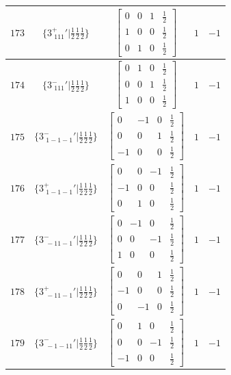 \documentclass[fleqn,8pt]{jsarticle}
\begin{document}
\begin{longtable}{ccccc}
$ 173 $ & $ \{3^{+}_{\,\,111}{}'|\frac{1}{2} \frac{1}{2} \frac{1}{2}\} $ & $ \begin{bmatrix} 0 & 0 & 1 & \frac{1}{2} \\ 1 & 0 & 0 & \frac{1}{2} \\ 0 & 1 & 0 & \frac{1}{2} \end{bmatrix} $ & $ 1 $ & $ -1 $ \\ \hline
$ 174 $ & $ \{3^{-}_{\,\,111}{}'|\frac{1}{2} \frac{1}{2} \frac{1}{2}\} $ & $ \begin{bmatrix} 0 & 1 & 0 & \frac{1}{2} \\ 0 & 0 & 1 & \frac{1}{2} \\ 1 & 0 & 0 & \frac{1}{2} \end{bmatrix} $ & $ 1 $ & $ -1 $ \\ \hline
$ 175 $ & $ \{3^{-}_{\,\,1-1-1}{}'|\frac{1}{2} \frac{1}{2} \frac{1}{2}\} $ & $ \begin{bmatrix} 0 & -1 & 0 & \frac{1}{2} \\ 0 & 0 & 1 & \frac{1}{2} \\ -1 & 0 & 0 & \frac{1}{2} \end{bmatrix} $ & $ 1 $ & $ -1 $ \\ \hline
$ 176 $ & $ \{3^{+}_{\,\,1-1-1}{}'|\frac{1}{2} \frac{1}{2} \frac{1}{2}\} $ & $ \begin{bmatrix} 0 & 0 & -1 & \frac{1}{2} \\ -1 & 0 & 0 & \frac{1}{2} \\ 0 & 1 & 0 & \frac{1}{2} \end{bmatrix} $ & $ 1 $ & $ -1 $ \\ \hline
$ 177 $ & $ \{3^{-}_{\,\,-11-1}{}'|\frac{1}{2} \frac{1}{2} \frac{1}{2}\} $ & $ \begin{bmatrix} 0 & -1 & 0 & \frac{1}{2} \\ 0 & 0 & -1 & \frac{1}{2} \\ 1 & 0 & 0 & \frac{1}{2} \end{bmatrix} $ & $ 1 $ & $ -1 $ \\ \hline
$ 178 $ & $ \{3^{+}_{\,\,-11-1}{}'|\frac{1}{2} \frac{1}{2} \frac{1}{2}\} $ & $ \begin{bmatrix} 0 & 0 & 1 & \frac{1}{2} \\ -1 & 0 & 0 & \frac{1}{2} \\ 0 & -1 & 0 & \frac{1}{2} \end{bmatrix} $ & $ 1 $ & $ -1 $ \\ \hline
$ 179 $ & $ \{3^{-}_{\,\,-1-11}{}'|\frac{1}{2} \frac{1}{2} \frac{1}{2}\} $ & $ \begin{bmatrix} 0 & 1 & 0 & \frac{1}{2} \\ 0 & 0 & -1 & \frac{1}{2} \\ -1 & 0 & 0 & \frac{1}{2} \end{bmatrix} $ & $ 1 $ & $ -1 $ \\ \hline

\end{longtable}
\end{document}
